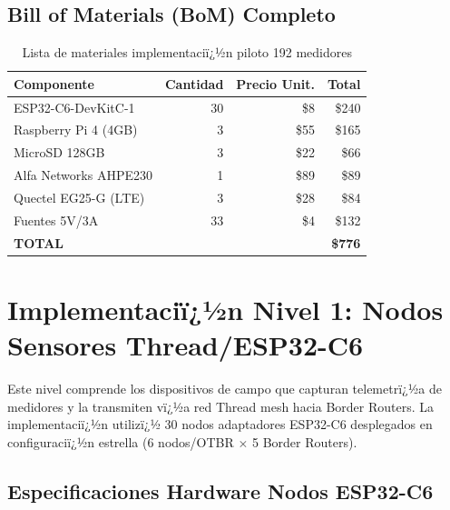 \subsection{Bill of Materials (BoM) Completo}

\begin{table}[h]
\centering
\caption{Lista de materiales implementaciï¿½n piloto 192 medidores}
\label{tab:impl-bom}
\begin{tabular}{|l|r|r|r|}
\hline
\textbf{Componente} & \textbf{Cantidad} & \textbf{Precio Unit.} & \textbf{Total} \\
\hline
ESP32-C6-DevKitC-1 & 30 & \$8 & \$240 \\
\hline
Raspberry Pi 4 (4GB) & 3 & \$55 & \$165 \\
\hline
MicroSD 128GB & 3 & \$22 & \$66 \\
\hline
Alfa Networks AHPE230 & 1 & \$89 & \$89 \\
\hline
Quectel EG25-G (LTE) & 3 & \$28 & \$84 \\
\hline
Fuentes 5V/3A & 33 & \$4 & \$132 \\
\hline
\textbf{TOTAL} & & & \textbf{\$776} \\
\hline
\end{tabular}
\end{table}

\section{Implementaciï¿½n Nivel 1: Nodos Sensores Thread/ESP32-C6}
\label{sec:impl-nivel1-nodos}

Este nivel comprende los dispositivos de campo que capturan telemetrï¿½a de medidores y la transmiten vï¿½a red Thread mesh hacia Border Routers. La implementaciï¿½n utilizï¿½ 30 nodos adaptadores ESP32-C6 desplegados en configuraciï¿½n estrella (6 nodos/OTBR $\times$ 5 Border Routers).

\subsection{Especificaciones Hardware Nodos ESP32-C6}
\label{sec:impl-nodos-hw}

